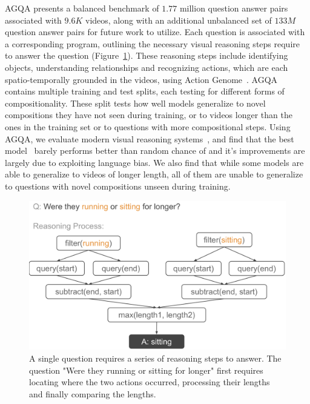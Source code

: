 AGQA presents a balanced benchmark of $1.77$ million question answer pairs associated with $9.6K$ videos, along with an additional unbalanced set of $133M$ question answer pairs for future work to utilize. Each question is associated with a corresponding program, outlining the necessary visual reasoning steps require to answer the question (Figure~\ref{fig:tree}). These reasoning steps include identifying objects, understanding relationships and recognizing actions, which are each spatio-temporally grounded in the videos, using Action Genome~\cite{ji2020action}. AGQA contains multiple training and test splits, each testing for different forms of compositionality. These split tests how well models generalize to novel compositions they have not seen during training, or to videos longer than the ones in the training set or to questions with more compositional steps. Using AGQA, we evaluate modern visual reasoning systems~\cite{fan2019heterogeneous, le2020hierarchical, li2019beyond}, and find that the best model~\cite{le2020hierarchical} barely performs better than random chance of and it's improvements are largely due to exploiting language bias. We also find that while some models are able to generalize to videos of longer length, all of them are unable to generalize to questions with novel compositions unseen during training.


\begin{figure}[t]
    \centering
    \includegraphics[width=0.95\linewidth]{figures/reasoning_tree.pdf}
    \caption{A single question requires a series of reasoning steps to answer. The question "Were they running or sitting for longer" first requires locating where the two actions occurred, processing their lengths and finally comparing the lengths.}
    \label{fig:tree}
\end{figure}


